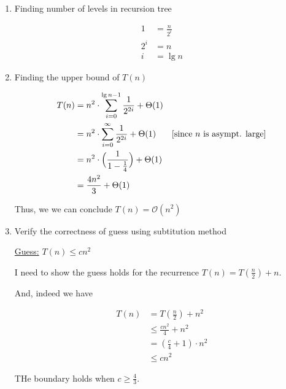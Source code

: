 \documentclass[12pt]{article}
\begin{document}
\begin{enumerate}[1.]
    \begin{enumerate}[1.]
        \item Finding number of levels in recursion tree

        \begin{align}
            1 &= \frac{n}{2^i}\\
            2^i &= n\\
            i &= \lg n
        \end{align}


        \item Finding the upper bound of $T(n)$

        \begin{align}
            T(n) &= n^2 \cdot \sum\limits_{i=0}^{\lg n - 1} \frac{1}{2^{2i}} + \Theta(1)\\
            &= n^2 \cdot \sum\limits_{i=0}^{\infty} \frac{1}{2^{2i}} + \Theta(1) & [\text{since $n$ is asympt. large}]\\
            &= n^2 \cdot \Bigl ( \frac{1}{1 - \frac{1}{4}} \Bigr) + \Theta(1)\\
            &= \frac{4n^2}{3} + \Theta(1)
        \end{align}

        \bigskip

        Thus, we we can conclude $T(n) = \mathcal{O}(n^2)$

        \bigskip


        \item Verify the correctness of guess using subtitution method

        \bigskip

        \underline{Guess:} $T(n) \leq cn^2$

        \bigskip

        I need to show the guess holds for the recurrence $T(n) = T(\frac{n}{2}) + n$.

        \bigskip

        And, indeed we have

        \begin{align}
            T(n) &= T(\frac{n}{2}) + n^2\\
            &\leq \frac{cn^2}{4} + n^2\\
            &=  (\frac{c}{4} + 1) \cdot n^2\\
            &\leq cn^2
        \end{align}

        \bigskip

        THe boundary holds when $c \geq \frac{4}{3}$.


\end{enumerate}
\end{enumerate}
\end{document}
